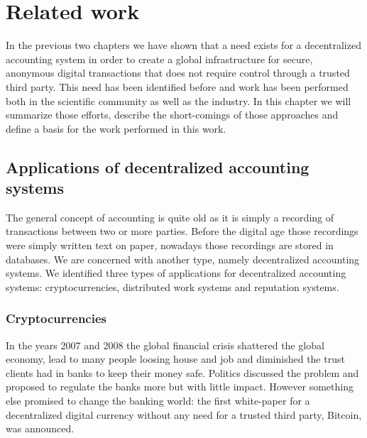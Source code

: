 \chapter{Related work}
In the previous two chapters we have shown that a need exists for a decentralized accounting system 
in order to create a global infrastructure for secure, anonymous digital transactions that does not 
require control through a trusted third party. This need has been identified before and work has 
been performed both in the scientific community as well as the industry. In this chapter we will 
summarize those efforts, describe the short-comings of those approaches and define a basis for the 
work performed in this work.

\section{Applications of decentralized accounting systems}
The general concept of accounting is quite old as it is simply a recording of transactions between
two or more parties. Before the digital age those recordings were simply written text on paper, 
nowadays those recordings are stored in databases. We are concerned with another type, namely 
decentralized accounting systems. We identified three types of applications for decentralized 
accounting systems: cryptocurrencies, distributed work systems and reputation systems. 

\subsection{Cryptocurrencies}
In the years 2007 and 2008 the global financial crisis shattered the global economy, lead to many
people loosing house and job and diminished the trust clients had in banks to keep their money safe.
Politics discussed the problem and proposed to regulate the banks more but with little impact. 
However something else promised to change the banking world: the first white-paper for a 
decentralized digital currency without any need for a trusted third party, Bitcoin, was announced. 

